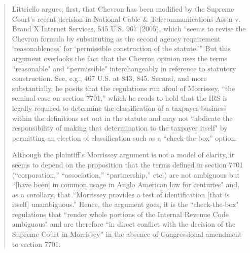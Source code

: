 \begin{enumerate}
\begin{quote}
Littriello argues, first, that Chevron has been modified by the Supreme Court's recent decision in National Cable \& Telecommunications Ass'n v. Brand X Internet Services, 545 U.S. 967 (2005), which ``seems to revise the Chevron formula by substituting as the second agency requirement `reasonableness' for `permissible construction of the statute.''' But this argument overlooks the fact that the Chevron opinion uses the terms ``reasonable" and ``permissible" interchangeably in reference to statutory construction. See, e.g., 467 U.S. at 843, 845. Second, and more substantially, he posits that the regulations run afoul of Morrissey, ``the seminal case on section 7701,'' which he reads to hold that the IRS is legally required to determine the classification of a taxpayer-business within the definitions set out in the statute and may not ``abdicate the responsibility of making that determination to the taxpayer itself" by permitting an election of classification such as a ``check-the-box'' option.

Although the plaintiff's Morrissey argument is not a model of clarity, it seems to depend on the proposition that the terms defined in section 7701 (``corporation,'' ``association,'' ``partnership,'' etc.) are not ambiguous but ``[have been] in common usage in Anglo American law for centuries" and, as a corollary, that ``Morrissey provides a test of identification [that is itself] unambiguous.'' Hence, the argument goes, it is the ``check-the-box" regulations that ``render whole portions of the Internal Revenue Code ambiguous" and are therefore ``in direct conflict with the decision of the Supreme Court in Morrissey'' in the absence of Congressional amendment to section 7701.


\end{quote}
\end{enumerate}
